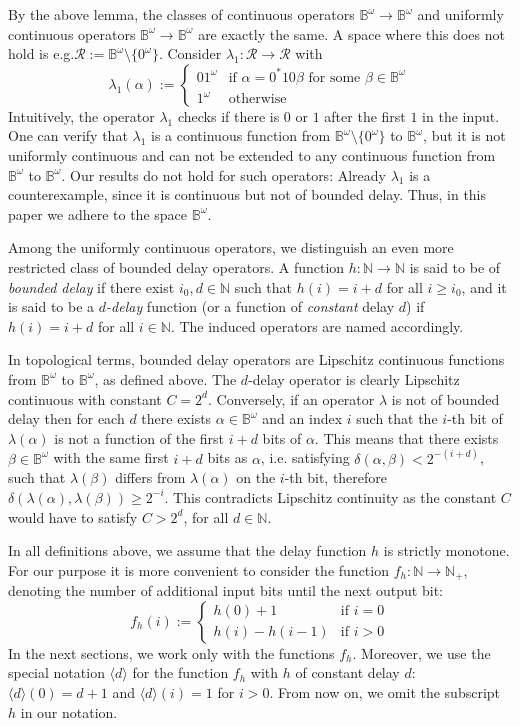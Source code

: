 \documentclass[fleqn,envcountsame]{LMCS}
\newcommand{\const}[1]{\ensuremath{\langle#1\rangle}\xspace}
\newcommand{\Nat}{\ensuremath{\mathbb{N}}\xspace}
\newcommand{\Natp}{\ensuremath{\mathbb{N}_+}\xspace}
\newcommand{\Bom}{\ensuremath{\mathbb{B}^{\omega}}\xspace}
\newcommand{\al}{\ensuremath{\alpha}\xspace}
\newcommand{\be}{\ensuremath{\beta}\xspace}
\newcommand{\ie}{i.e.\xspace}
\newcommand{\eg}{e.g.\xspace}
\begin{document}
By the above lemma, the classes of continuous operators $\Bom\to\Bom$ and
uniformly continuous operators $\Bom\to\Bom$ are exactly the same.
A space where this does not hold is \eg $\mathcal{R}:=\Bom\setminus\{0^{\omega}\}$.
Consider $\lambda_1:\mathcal{R}\to\mathcal{R}$ with
\[ \lambda_1(\al):=\begin{cases}
  01^{\omega} & \text{if }\al=0^*10\be\text{ for some }\be\in\Bom\\
  1^{\omega} & \text{otherwise}
\end{cases} \]
Intuitively, the operator $\lambda_1$ checks if there is $0$ or $1$
after the first $1$ in the input. One can verify that $\lambda_1$ is
a continuous function from $\Bom\setminus\{0^{\omega}\}$ to \Bom, but
it is not uniformly continuous and can not be extended to any continuous
function from \Bom to \Bom. Our results do not hold for such operators:
Already $\lambda_1$ is a counterexample, since it is continuous
but not of bounded delay. Thus, in this paper we adhere to the space \Bom.

Among the uniformly continuous operators, we distinguish an even more
restricted class of bounded delay operators. A function $h:\Nat\to\Nat$
is said to be of \emph{bounded delay} if there exist $i_0,d\in\Nat$
such that $h(i)=i+d$ for all $i\geq i_0$, and it is said to be
a \emph{$d$-delay} function (or a function of \emph{constant} delay $d$)
if $h(i)=i+d$ for all $i\in\Nat$. The induced operators are named accordingly.

In topological terms, bounded delay operators are Lipschitz continuous
functions from \Bom to \Bom, as defined above. The $d$-delay operator is
clearly Lipschitz continuous with constant $C = 2^{d}$.
Conversely, if an operator $\lambda$ is not of bounded delay
then for each $d$ there exists $\al\in\Bom$ and an index $i$
such that the $i$-th bit of $\lambda(\al)$ is not a function of the first
$i+d$ bits of \al. This means that there exists $\be\in\Bom$ with the same
first $i+d$ bits as \al, \ie satisfying $\delta(\al,\be)<2^{-(i+d)}$,
such that $\lambda(\be)$ differs from $\lambda(\al)$ on the $i$-th bit,
therefore $\delta(\lambda(\al),\lambda(\be))\geq2^{-i}$. This contradicts 
Lipschitz continuity as the constant $C$ would have to satisfy $C>2^{d}$,
for all $d\in\Nat$.

In all definitions above, we assume that the delay function
$h$ is strictly monotone. For our purpose it is more convenient
to consider the function $f_h:\Nat\to\Natp$,
denoting the number of additional input bits until the next output bit:
\[ f_h(i) := \begin{cases}
    h(0)+1 & \text{if }i=0\\
    h(i)-h(i-1) & \text{if }i>0
\end{cases} \]
In the next sections, we work only with the functions $f_h$.
Moreover, we use the special notation \const{d} for
the function $f_h$ with $h$ of constant delay $d$:
$\const{d}(0)=d+1$ and $\const{d}(i)=1$ for $i>0$.
From now on, we omit the subscript $h$ in our notation.
\end{document}
